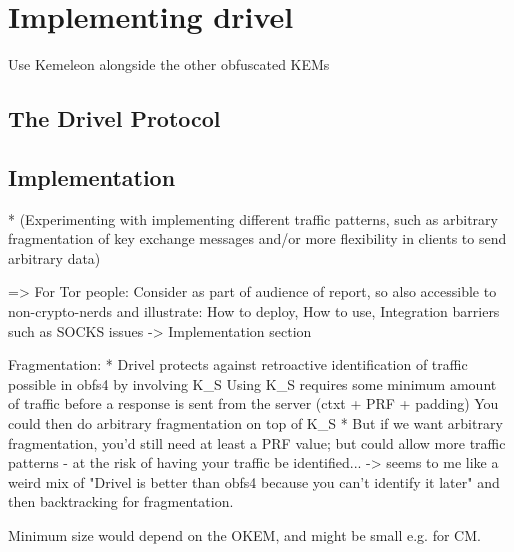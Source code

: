 \chapter{Implementing drivel}\label{ch:implementation}

Use Kemeleon alongside the other obfuscated KEMs

\section{The Drivel Protocol} \label{sec:drivel}

\section{Implementation} \label{sec:implementation}

* (Experimenting with implementing different traffic patterns, such as arbitrary fragmentation of key
exchange messages and/or more flexibility in clients to send arbitrary data)


=> For Tor people: Consider as part of audience of report, so also accessible to non-crypto-nerds and illustrate: How to deploy, How to use, Integration barriers such as SOCKS issues -> Implementation section


Fragmentation:
* Drivel protects against retroactive identification of traffic possible in obfs4 by involving K_S
    Using K_S requires some minimum amount of traffic before a response is sent from the server (ctxt + PRF + padding)
    You could then do arbitrary fragmentation on top of K_S
* But if we want arbitrary fragmentation, you'd still need at least a PRF value; but could allow more traffic patterns - at the risk of having your traffic be identified...
-> seems to me like a weird mix of "Drivel is better than obfs4 because you can't identify it later" and then backtracking for fragmentation.

Minimum size would depend on the OKEM, and might be small e.g. for CM.
